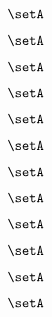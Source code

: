 \begin{forslides}
    \begin{equation}
        \label{eq:slides-translation-39}
        \setA
    \end{equation}
    
    \begin{equation}
        \label{eq:slides-translation-40}
        \setA
    \end{equation}

    \begin{equation}
        \label{eq:slides-translation-41}
        \setA
    \end{equation}

    \begin{equation}
        \label{eq:slides-translation-42}
        \setA
    \end{equation}

    \begin{equation}
        \label{eq:slides-translation-43}
        \setA
    \end{equation}

    \begin{equation}
        \label{eq:slides-translation-44}
        \setA
    \end{equation}

    \begin{equation}
        \label{eq:slides-translation-45}
        \setA
    \end{equation}

    \begin{equation}
        \label{eq:slides-translation-46}
        \setA
    \end{equation}

    \begin{equation}
        \label{eq:slides-translation-47}
        \setA
    \end{equation}

    \begin{equation}
        \label{eq:slides-translation-48}
        \setA
    \end{equation}

    \begin{equation}
        \label{eq:slides-translation-49}
        \setA
    \end{equation}
    
    \begin{equation}
        \label{eq:slides-translation-50}
        \setA
    \end{equation}


\end{forslides}
